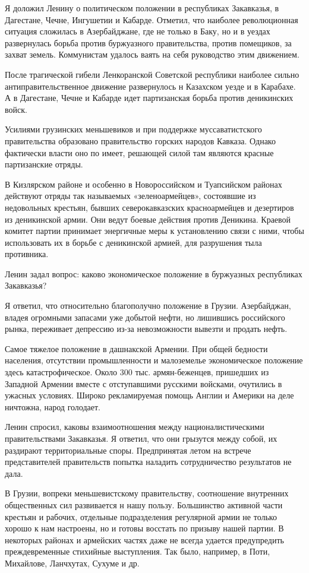 \documentclass[12pt, a4paper, openany]{book}
\begin{document}
Я доложил Ленину о политическом положении в республиках Закавказья, в Дагестане, Чечне, Ингушетии и Кабарде. Отметил, что наиболее революционная ситуация сложилась в Азербайджане, где не только в Баку, но и в уездах развернулась борьба против буржуазного правительства, против помещиков, за захват земель. Коммунистам удалось ваять на себя руководство этим движением.

После трагической гибели Ленкоранской Советской республики наиболее сильно антиправительственное движение развернулось н Казахском уезде и в Карабахе. А в Дагестане, Чечне и Кабарде идет партизанская борьба против деникинских войск.

Усилиями грузинских меньшевиков и при поддержке муссаватистского правительства образовано правительство горских народов Кавказа. Однако фактически власти оно по имеет, решающей силой там являются красные партизанские отряды.

В Кизлярском районе и особенно в Новороссийском и Туапсийском районах действуют отряды так называемых «зеленоармейцев», состоявшие из недовольных крестьян, бывших северокавказских красноармейцев и дезертиров из деникинской армии. Они ведут боевые действия против Деникина. Краевой комитет партии принимает энергичные меры к установлению связи с ними, чтобы использовать их в борьбе с деникинской армией, для разрушения тыла противника.

Ленин задал вопрос: каково экономическое положение в буржуазных республиках Закавказья?

Я ответил, что относительно благополучно положение в Грузии. Азербайджан, владея огромными запасами уже добытой нефти, но лишившись российского рынка, переживает депрессию из-за невозможности вывезти и продать нефть.

Самое тяжелое положение в дашнакской Армении. При общей бедности населения, отсутствии промышленности и малоземелье экономическое положение здесь катастрофическое. Около 300 тыс. армян-беженцев, пришедших из Западной Армении вместе с отступавшими русскими войсками, очутились в ужасных условиях. Широко рекламируемая помощь Англии и Америки на деле ничтожна, народ голодает.

Ленин спросил, каковы взаимоотношения между националистическими правительствами Закавказья. Я ответил, что они грызутся между собой, их раздирают территориальные споры. Предпринятая летом на встрече представителей правительств попытка наладить сотрудничество результатов не дала.

В Грузии, вопреки меньшевистскому правительству, соотношение внутренних общественных сил развивается н нашу пользу. Большинство активной части крестьян и рабочих, отдельные подразделения регулярной армии не только хорошо к нам настроены, но и готовы восстать по призыву нашей партии. В некоторых районах и армейских частях даже не всегда удается предупредить преждевременные стихийные выступления. Так было, например, в Поти, Михайлове, Ланчхутах, Сухуме и др.
\end{document}
